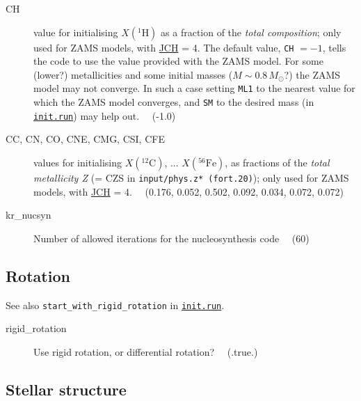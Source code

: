 \begin{description}
\item[CH]
  \hypertarget{ch}{}
  value for initialising $X(^{1}\mathrm{H})$ as a fraction of the \emph{total composition}; 
    only used for ZAMS models, with \hyperlink{jch}{JCH} = 4.  The default value, \texttt{CH} $= -1$,
    tells the code to use the value provided with the ZAMS model.
    For some (lower?) metallicities and some initial masses ($M\sim0.8\,M_\odot$?) the ZAMS model may not converge.
    In such a case setting \texttt{ML1} to the nearest value for which the ZAMS model converges, and \texttt{SM} to the 
    desired mass (in \hyperlink{initrun}{\texttt{init.run}}) may help out. \ \ (-1.0) 
\item[CC, CN, CO, CNE, CMG, CSI, CFE]
  \hypertarget{cc}{}\hypertarget{cn}{}\hypertarget{co}{}\hypertarget{cne}{}\hypertarget{cmg}{}\hypertarget{csi}{}\hypertarget{cfe}{} 
  values for initialising $X(^{12}\mathrm{C})$, ... $X(^{56}\mathrm{Fe})$, as fractions of the 
  \emph{total metallicity Z} (= CZS in \texttt{input/phys.z* (fort.20)}); only used for ZAMS models, with \hyperlink{jch}{JCH} = 4.
  \ \ (0.176, 0.052, 0.502, 0.092, 0.034, 0.072, 0.072) 
\item[kr\_nucsyn]\hypertarget{kr_nucsyn}{} Number of allowed iterations for the nucleosynthesis code  \ \ (60)
\end{description}





\subsection{Rotation}
\label{sec:initdat:rotation}

See also \texttt{start\_with\_rigid\_rotation} in \hyperlink{initrun}{\texttt{init.run}}.

\begin{description}
\item[rigid\_rotation]\hypertarget{rigid_rotation}{}  Use rigid rotation, or differential rotation?  \ \ (.true.)
\end{description}




\subsection{Stellar structure}
\label{sec:initdat:stellarstructure}

